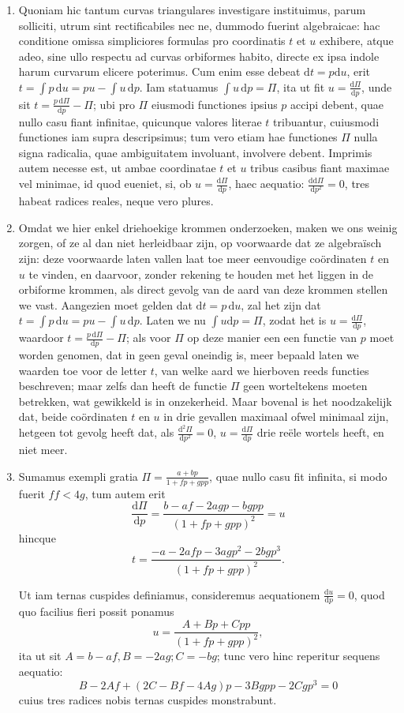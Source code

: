 \documentclass[10pt,a4paper]{article}
\newcommand{\switchenum}{\setcounter{enumi}{\arabic{enumi}-1}\switchcolumn}
\def\D{\mathrm{d}}
\begin{document}
\begin{paracol}{2}
\begin{enumerate}[topsep=1px]
		\switchcolumn*
		
		\item Quoniam hic tantum curvas triangulares investigare instituimus, parum solliciti, utrum sint rectificabiles nec ne, dummodo fuerint algebraicae: hac conditione omissa simpliciores formulas pro coordinatis $t$ et $u$ exhibere, atque adeo, sine ullo respectu ad curvas orbiformes habito, directe ex ipsa indole harum curvarum elicere poterimus. Cum enim esse debeat $\D t=p \D u$, erit $t=\int p\,\D u = pu-\int u \,\D p$. Iam statuamus $\int u \,\D p = \Pi$, ita ut fit $u=\frac{\D \Pi}{\D p}$, unde sit $t=\frac{p\,\D \Pi}{\D p}-\Pi$; ubi pro $\Pi$ eiusmodi functiones ipsius $p$ accipi debent, quae nullo casu fiant infinitae, quicunque valores literae $t$ tribuantur, cuiusmodi functiones iam supra descripsimus; tum vero etiam hae functiones $\Pi$ nulla signa radicalia, quae ambiguitatem involuant, involvere debent. Imprimis autem necesse est, ut ambae coordinatae $t$ et $u$ tribus casibus fiant maximae vel minimae, id quod eueniet, si, ob $u=\frac{\D \Pi}{\D p}$, haec aequatio: $\frac{\D\D \Pi}{\D p^2} = 0$, tres habeat radices reales, neque vero plures.

		\switchenum
		\item Omdat we hier enkel driehoekige krommen onderzoeken, maken we ons weinig zorgen, of ze al dan niet herleidbaar zijn, op voorwaarde dat ze algebraïsch zijn: deze voorwaarde laten vallen laat toe meer eenvoudige coördinaten $t$ en $u$ te vinden, en daarvoor, zonder rekening te houden met het liggen in de orbiforme krommen, als direct gevolg van de aard van deze krommen stellen we vast. Aangezien moet gelden dat $\D t = p\, \D u$, zal het zijn dat $t=\int p \, \D u= pu-\int u \, \D p$. Laten we nu $\int u \D p = \Pi$, zodat het is $u = \frac{\D \Pi}{\D p}$, waardoor $t=\frac{p\,\D \Pi}{\D p}-\Pi$; als voor $\Pi$ op deze manier een een functie van $p$ moet worden genomen, dat in geen geval oneindig is, meer bepaald laten we waarden toe voor de letter $t$, van welke aard we hierboven reeds functies beschreven; maar zelfs dan heeft de functie $\Pi$ geen worteltekens moeten betrekken, wat gewikkeld is in onzekerheid. Maar bovenal is het noodzakelijk dat, beide coördinaten $t$ en $u$ in drie gevallen maximaal ofwel minimaal zijn, hetgeen tot gevolg heeft dat,  als $\frac{\D^2 \Pi}{\D p^2}=0$, $u=\frac{\D \Pi }{\D p}$ drie reële wortels heeft, en niet meer.
		\switchcolumn*
		
		\item Sumamus exempli gratia $\Pi = \frac{a+bp}{1+fp+gpp}$, quae nullo casu fit infinita, si modo fuerit $ff< 4g$, tum autem erit
		\[
			\frac{\D \Pi}{\D p} = \frac{b-af-2agp-bgpp}{(1+fp+gpp)^2} = u
		\]
		hincque
		\[
			t = \frac{-a-2afp-3agp^2-2bgp^3}{(1+fp+gpp)^2}.
		\]
		\par Ut iam ternas cuspides definiamus, consideremus aequationem $\frac{\D u}{\D p} = 0$, quod quo facilius fieri possit ponamus
		\[
			u  =  \frac{A+Bp+Cpp}{(1+fp+gpp)^2},
		\]
		ita ut sit $A=b-af, B=-2ag; C=-bg$; tunc vero hinc reperitur sequens aequatio:
		\[
			B-2Af+(2C-Bf-4Ag)p-3Bgpp-2Cgp^3 = 0
		\]
		cuius tres radices nobis ternas cuspides monstrabunt.
		

\end{enumerate}
\end{paracol}
\end{document}
